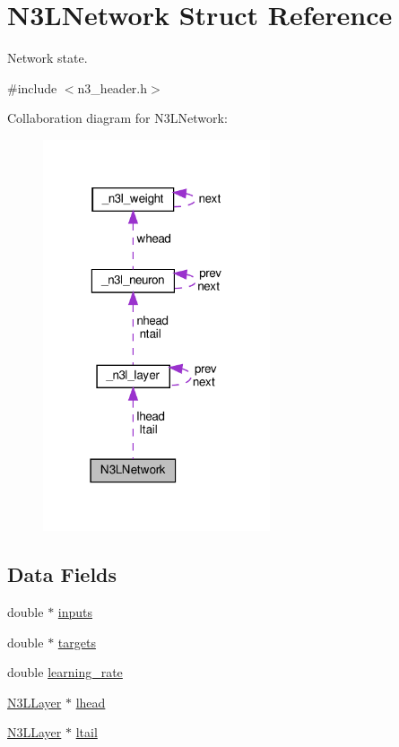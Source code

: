 \hypertarget{structN3LNetwork}{}\section{N3\+L\+Network Struct Reference}
\label{structN3LNetwork}


Network state.  




{\ttfamily \#include $<$n3\+\_\+header.\+h$>$}



Collaboration diagram for N3\+L\+Network\+:\nopagebreak
\begin{figure}[H]
\begin{center}
\leavevmode
\includegraphics[width=190pt]{structN3LNetwork__coll__graph}
\end{center}
\end{figure}
\subsection*{Data Fields}
\begin{DoxyCompactItemize}
\item 
double $\ast$ \hyperlink{structN3LNetwork_a45ff5bcae18502559925aba0cbd0313b}{inputs}
\item 
double $\ast$ \hyperlink{structN3LNetwork_aba0f6767a66173743840b7c9fa919daf}{targets}
\item 
double \hyperlink{structN3LNetwork_ae7c5e2ed74786685185cf2cbb955bf51}{learning\+\_\+rate}
\item 
\hyperlink{n3__header_8h_a9ee3a7104816bdb6222148cfe9ca8ad9}{N3\+L\+Layer} $\ast$ \hyperlink{structN3LNetwork_ae77d4b7deecdc3c9590a4112689db2f8}{lhead}
\item 
\hyperlink{n3__header_8h_a9ee3a7104816bdb6222148cfe9ca8ad9}{N3\+L\+Layer} $\ast$ \hyperlink{structN3LNetwork_a758fd06b3dda29e064ccd4bc4d27e1c3}{ltail}
\end{DoxyCompactItemize}


